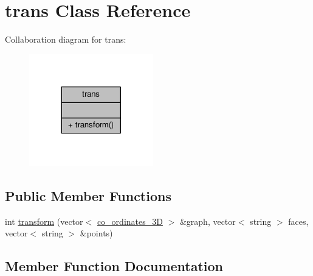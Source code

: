 \hypertarget{classtrans}{}\section{trans Class Reference}
\label{classtrans}


Collaboration diagram for trans\+:
\nopagebreak
\begin{figure}[H]
\begin{center}
\leavevmode
\includegraphics[width=153pt]{classtrans__coll__graph}
\end{center}
\end{figure}
\subsection*{Public Member Functions}
\begin{DoxyCompactItemize}
\item 
int \hyperlink{classtrans_a4b4cf2c3c335d274fa6b95ed1c427fae}{transform} (vector$<$ \hyperlink{structco__ordinates__3D}{co\+\_\+ordinates\+\_\+3D} $>$ \&graph, vector$<$ string $>$ faces, vector$<$ string $>$ \&points)
\end{DoxyCompactItemize}


\subsection{Member Function Documentation}
